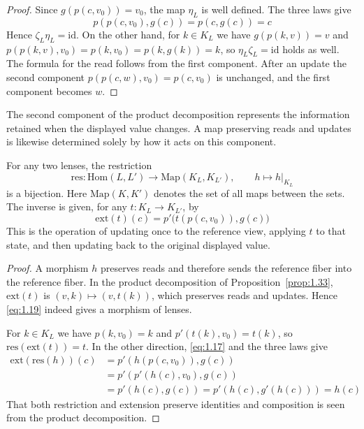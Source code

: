 \begin{proof}

Since $g(p(c,v_0))=v_0$, the map $\eta_L$ is well defined.
The three laws give
\[
p(p(c,v_0),g(c))=p(c,g(c))=c
\]
Hence $\zeta_L\eta_L=\mathrm{id}$. On the other hand, for $k\in K_L$ we have
$g(p(k,v))=v$ and
$p(p(k,v),v_0)=p(k,v_0)=p(k,g(k))=k$, so
$\eta_L\zeta_L=\mathrm{id}$ holds as well.
The formula for the read follows from the first component. After an update the
second component $p(p(c,w),v_0)=p(c,v_0)$ is unchanged, and the first component
becomes $w$.

\end{proof}

The second component of the product decomposition represents the information
retained when the displayed value changes.
A map preserving reads and updates is likewise determined solely by how it acts
on this component.

\begin{proposition}\label{prop:1.34}

For any two lenses, the restriction
\[
\mathrm{res}:\mathrm{Hom}(L,L')
\longrightarrow\mathrm{Map}(K_L,K_{L'}),\qquad
h\longmapsto h|_{K_L}
\]
is a bijection. Here $\mathrm{Map}(K,K')$ denotes the set of all maps between
the sets.
The inverse is given, for any $t:K_L\to K_{L'}$, by
\begin{equation*}
\mathrm{ext}(t)(c)=p'\bigl(t(p(c,v_0)),g(c)\bigr)
\tag{1.19}\label{eq:1.19}
\end{equation*}
This is the operation of updating once to the reference view, applying $t$ to
that state, and then updating back to the original displayed value.

\end{proposition}

\begin{proof}

A morphism $h$ preserves reads and therefore sends the reference fiber into the
reference fiber.
In the product decomposition of Proposition~\ref{prop:1.33}, $\mathrm{ext}(t)$
is $(v,k)\mapsto(v,t(k))$, which preserves reads and updates.
Hence \eqref{eq:1.19} indeed gives a morphism of lenses.

For $k\in K_L$ we have $p(k,v_0)=k$ and
$p'(t(k),v_0)=t(k)$, so $\mathrm{res}(\mathrm{ext}(t))=t$.
In the other direction, \eqref{eq:1.17} and the three laws give
\[
\begin{aligned}
\mathrm{ext}(\mathrm{res}(h))(c)
&=p'(h(p(c,v_0)),g(c))\\
&=p'(p'(h(c),v_0),g(c))\\
&=p'(h(c),g(c))
=p'(h(c),g'(h(c)))=h(c)
\end{aligned}
\]
That both restriction and extension preserve identities and composition is seen
from the product decomposition.

\end{proof}

